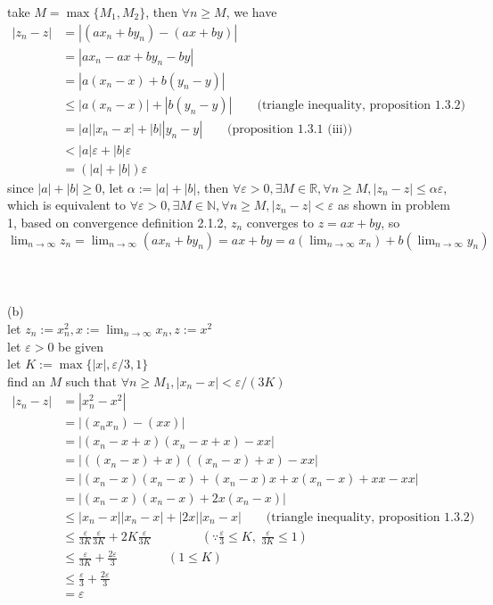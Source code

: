 \documentclass[12pt, border = 4pt, multi]{article} %
\begin{document}
take $M = \max\{M_1, M_2\}$, then $\forall n \geq M$, we have
\begin{align*}
|z_n - z| &= |(ax_n + by_n) - (ax + by)|\\
&= |ax_n - ax + by_n - by|\\
&= |a(x_n - x) + b(y_n - y)|\\
&\leq |a(x_n - x)| + |b(y_n - y)| \qquad \text{(triangle inequality, proposition 1.3.2)}\\
&= |a||x_n - x| + |b||y_n - y| \qquad \text{(proposition 1.3.1 (iii))}\\
&< |a|\varepsilon + |b|\varepsilon\\
&= (|a| + |b|)\varepsilon
\end{align*}
since $|a| + |b| \geq 0$, let $\alpha := |a| + |b|$, then $\forall \varepsilon > 0, \exists M \in \mathbb{R}, \forall n \geq M, |z_n - z| \leq \alpha\varepsilon$, which is equivalent to $\forall \varepsilon > 0, \exists M \in \mathbb{N}, \forall n \geq M, |z_n - z| < \varepsilon$ as shown in problem 1, based on convergence definition 2.1.2, $z_n$ converges to $z = ax + by$, so $\lim_{n \rightarrow \infty} z_n = \lim_{n \rightarrow \infty}  (ax_n + by_n) = ax + by = a(\lim_{n \rightarrow \infty} x_n) + b(\lim_{n \rightarrow \infty} y_n)$\\
\\
\\
\\
(b)\\
let $z_n := x_n ^ 2, x := \lim_{n \rightarrow \infty} x_n, z := x ^ 2$\\
let $\varepsilon > 0$ be given\\
let $K := \max\{|x|, \varepsilon / 3, 1\}$\\
find an $M$ such that $\forall n \geq M_1, |x_n - x| < \varepsilon / (3K)$\\
\begin{align*}
|z_n - z| &= |x_n ^ 2 - x ^ 2|\\
&= |(x_n x_n) - (xx)|\\
&= |(x_n - x + x)(x_n - x + x) - xx|\\
&= |((x_n - x) + x)((x_n - x) + x) - xx|\\
&= |(x_n - x)(x_n - x) + (x_n - x)x + x(x_n - x) + xx - xx|\\
&= |(x_n - x)(x_n - x) + 2x(x_n - x)|\\
&\leq |x_n - x||x_n - x| + |2x||x_n - x| \qquad \text{(triangle inequality, proposition 1.3.2)}\\
&\leq \frac{\varepsilon}{3K}\frac{\varepsilon}{3K} + 2K\frac{\varepsilon}{3K} \qquad\qquad \left(\because \frac{\varepsilon}{3} \leq K,\; \frac{\varepsilon}{3K} \leq 1\right)\\
&\leq \frac{\varepsilon}{3K} + \frac{2\varepsilon}{3} \qquad\qquad (1 \leq K)\\
&\leq \frac{\varepsilon}{3} + \frac{2\varepsilon}{3}\\
&= \varepsilon
\end{align*}
\end{document}
